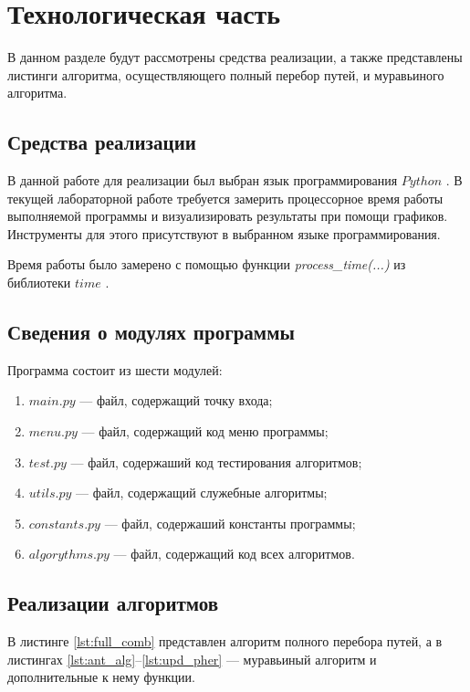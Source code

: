 \chapter{Технологическая часть}

В данном разделе будут рассмотрены средства реализации, а также представлены листинги алгоритма, осуществляющего полный перебор путей, и муравьиного алгоритма.

\section{Средства реализации}
В данной работе для реализации был выбран язык программирования $Python$ \cite{python-lang}. В текущей лабораторной работе требуется замерить процессорное время работы выполняемой программы
и визуализировать результаты при помощи графиков. Инструменты для этого присутствуют в выбранном языке программирования.

Время работы было замерено с помощью функции \textit{process\_time(...)} из библиотеки $time$ \cite{python-lang-time}.

\section{Сведения о модулях программы}
Программа состоит из шести модулей:
\begin{enumerate}[label=\arabic*)]
	\item $main.py$ --- файл, содержащий точку входа;
	\item $menu.py$ --- файл, содержащий код меню программы;
	\item $test.py$ --- файл, содержаший код тестирования алгоритмов;
	\item $utils.py$ --- файл, содержащий служебные алгоритмы;
	\item $constants.py$ --- файл, содержаший константы программы;
	\item $algorythms.py$ --- файл, содержащий код всех алгоритмов. 
\end{enumerate}


\section{Реализации алгоритмов}

В листинге \ref{lst:full_comb} представлен алгоритм полного перебора путей, а в листингах \ref{lst:ant_alg}--\ref{lst:upd_pher} --- муравьиный алгоритм и дополнительные к нему функции.

